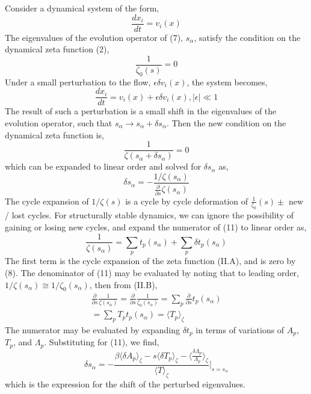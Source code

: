 \documentclass[pre,aps,twocolumn,showpacs,hyperref]{revtex4-1} %
\begin{document}
Consider a dynamical system of the form,
\begin{equation}
\frac{dx_{i}}{dt}=v_{i}(x)
\end{equation}
The eigenvalues of the evolution operator of (7), $s_{\alpha}$, satisfy the condition on the dynamical zeta function (2),
\begin{equation}
\frac{1}{\zeta_{0} (s)} = 0
\end{equation}
Under a small perturbation to the flow, $\epsilon \delta v_{i}(x)$, the system becomes,
\begin{equation}
\frac{dx_{i}}{dt}=v_{i}(x) + \epsilon \delta v_{i}(x), \vert\epsilon\vert \ll 1
\end{equation}
The result of such a perturbation is a small shift in the eigenvalues of the evolution operator, such that $s_{\alpha}\rightarrow s_{\alpha} + \delta s_{\alpha}$. Then the new condition on the dynamical zeta function is,
\begin{equation}
\frac{1}{\zeta(s_{\alpha}+\delta s_{\alpha})} = 0
\end{equation}
which can be expanded to linear order and solved for $\delta s_{\alpha}$ as,
\begin{equation}
\delta s_{\alpha} = -\frac{1/\zeta(s_{\alpha})}{\frac{\partial}{\partial s}\zeta (s_{\alpha})}
\end{equation}
The cycle expansion of $1/\zeta(s)$ is a cycle by cycle deformation of $\frac{1}{\zeta_{0}}(s)\pm$ new / lost cycles. For structurally stable dynamics, we can ignore the possibility of gaining or losing new cycles, and expand the numerator of (11) to linear order as,
\begin{equation}
\frac{1}{\zeta (s_{\alpha})} = \sum_{p}t_{p}(s_{\alpha}) + \sum_{p}\delta t_{p}(s_{\alpha})
\end{equation}
The first term is the cycle expansion of the zeta function (II.A), and is zero by (8). The denominator of (11) may be evaluated by noting that to leading order, $1/\zeta(s_{\alpha}) \cong 1/\zeta_{0}(s_{\alpha})$, then from (II.B),
\begin{eqnarray*}
\frac{\partial}{\partial s}\frac{1}{\zeta (s_{\alpha})} = \frac{\partial}{\partial s}\frac{1}{\zeta_{0} (s_{\alpha})} = \sum_{p}\frac{\partial}{\partial s}t_{p}(s_{\alpha}) \\ =  \sum_{p}T_{p}t_{p}(s_{\alpha}) =  \langle T_{p}\rangle_{\zeta}
\end{eqnarray*}
The numerator may be evaluated by expanding $\delta t_{p}$ in terms of variations of $A_{p}$, $T_{p}$, and $\Lambda_{p}$. Substituting for (11), we find,
\begin{equation}
\delta s_{\alpha} = -\frac{\beta \langle\delta A_{p}\rangle_\zeta - s\langle\delta T_{p}\rangle_{\zeta} - \langle\frac{\delta \Lambda_{p}}{\Lambda_{p}}\rangle_{\zeta}}{\langle T\rangle_{\zeta}}\vert_{s=s_{\alpha}}
\end{equation}
which is the expression for the shift of the perturbed eigenvalues.
\end{document}
